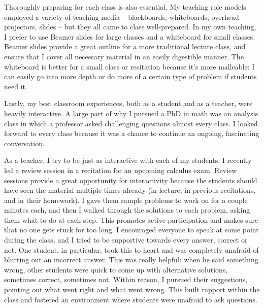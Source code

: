 \documentclass[12pt]{article}
\theoremstyle{plain} \numberwithin{equation}{section}
\theoremstyle{definition}
\begin{document}
Thoroughly preparing for each class is also essential.  My teaching role models employed a variety of teaching media -- blackboards, whiteboards, overhead projectors, slides -- but they all came to class well-prepared.  In my own teaching, I prefer to use Beamer slides for large classes and a whiteboard for small classes.    Beamer slides provide a great outline for a more traditional lecture class, and ensure that I cover all necessary material in an easily digestible manner.  The whiteboard is better for a small class or recitation because it’s more malleable: I can easily go into more depth or do more of a certain type of problem if students need it.  

Lastly, my best classroom experiences, both as a student and as a teacher, were heavily interactive.  A large part of why I pursued a PhD in math was an analysis class in which a professor asked challenging questions almost every class. I looked forward to every class because it was a chance to continue an ongoing, fascinating conversation.

As a teacher, I try to be just as interactive with each of my students. I recently led a review session in a recitation for an upcoming calculus exam.  Review sessions provide a great opportunity for interactivity because the students should have seen the material multiple times already (in lecture, in previous recitations, and in their homework).  I gave them sample problems to work on for a couple minutes each, and then I walked through the solutions to each problem, asking them what to do at each step.  This promotes active participation and makes sure that no one gets stuck for too long.   I encouraged everyone to speak at some point during the class, and I tried to be supportive towards every answer, correct or not.  One student, in particular, took this to heart and was completely unafraid of blurting out an incorrect answer.  This was really helpful: when he said something wrong, other students were quick to come up with alternative solutions, sometimes correct, sometimes not.  Within reason, I pursued their suggestions, pointing out what went right and what went wrong.  This built rapport within the class and fostered an environment where students were unafraid to ask questions.

\end{document}
